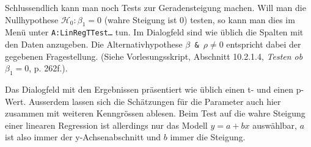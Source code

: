 \documentclass[a4paper,11pt,notitlepage,halfparskip,headsepline,normalheadings,twoside]{scrartcl}
\newlength{\tikey}
\newcommand{\keystroke}[1]{\settowidth{\tikey}{\scriptsize #1}\psframebox[framearc=0.2]{\parbox{\tikey}{\scriptsize\textsf{#1}}}}
\begin{document}
\begin{window}
Schlussendlich kann man noch Tests zur Geradensteigung machen. Will man die
Nullhypothese $\mathcal{H}_0: \beta_1=0$ (wahre Steigung ist 0) testen, so kann
man dies im Menü \keystroke{F6} unter \texttt{A:LinRegTTest\ldots} tun. Im
Dialogfeld sind wie üblich die Spalten mit den Daten anzugeben. Die
Alternativhypothese \texttt{$\beta$ \& $\rho\ne 0$} entspricht dabei der
gegebenen Fragestellung. (Siehe Vorlesungsskript, Abschnitt 10.2.1.4,
\textit{Testen ob $\beta_1=0$}, p. 262f.).
\end{window}

\begin{window}
Das Dialogfeld mit den Ergebnissen präsentiert wie üblich einen t- und einen
p-Wert. Ausserdem lassen sich die Schätzungen für die Parameter auch hier
zusammen mit weiteren Kenngrössen ablesen. Beim Test auf die wahre Steigung einer linearen Regression ist
allerdings nur das Modell $y=a+bx$ auswählbar, $a$ ist also immer der
y-Achsenabschnitt und $b$ immer die Steigung. 
\end{window}
\end{document}
